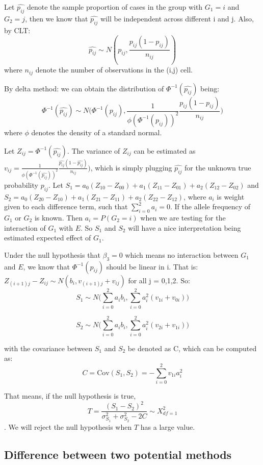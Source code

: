 \documentclass[]{article}
\begin{document}
Let \(\hat{p_{ij}}\) denote the sample proportion of cases in the group
with \(G_1 = i\) and \(G_2 = j\), then we know that \(\hat{p_{ij}}\)
will be independent across different i and j. Also, by CLT:
\[\hat{p_{ij}} \sim N(p_{ij},\frac{p_{ij}(1-p_{ij})}{n_{ij}})\] where
\(n_{ij}\) denote the number of observations in the (i,j) cell.

By delta method: we can obtain the distribution of
\(\Phi^{-1}(\hat{p_{ij}})\) being:
\[\Phi^{-1}(\hat{p_{ij}}) \sim N\bigg(\Phi^{-1}(p_{ij}),\frac{1}{\phi(\Phi^{-1}(p_{ij}))^2}\frac{p_{ij}(1-p_{ij})}{n_{ij}}\bigg)\]
where \(\phi\) denotes the density of a standard normal.

Let \(Z_{ij} = \Phi^{-1}(\hat{p_{ij}})\). The variance of \(Z_{ij}\) can
be estimated as
\(v_{ij} = \frac{1}{\phi(\Phi^{-1}(\hat{p_{ij}}))^2}\frac{\hat{p_{ij}}(1-\hat{p_{ij}})}{n_{ij}}\bigg)\),
which is simply plugging \(\hat{p_{ij}}\) for the unknown true
probability \(p_{ij}\). Let
\(S_1 = a_0(Z_{10}-Z_{00}) + a_1(Z_{11}-Z_{01}) + a_2(Z_{12}-Z_{02})\)
and
\(S_2 = a_0(Z_{20}-Z_{10}) + a_1(Z_{21}-Z_{11}) + a_2(Z_{22}-Z_{12})\),
where \(a_i\) is weight given to each difference term, such that
\(\sum_{i=0}^2 a_i =0\). If the allele frequency of \(G_1\) or \(G_2\)
is known. Then \(a_i = P(G_2 =i)\) when we are testing for the
interaction of \(G_1\) with \(E\). So \(S_1\) and \(S_2\) will have a
nice interpretation being estimated expected effect of \(G_1\).

Under the null hypothesis that \(\beta_3 =0\) which means no interaction
between \(G_1\) and \(E\), we know that \(\Phi^{-1}(p_{ij})\) should be
linear in i. That is:
\(Z_{(i+1)j} - Z_{ij} \sim N(b_i,v_{(i+1)j} + v_{ij})\) for all j =
0,1,2. So:
\[S_1 \sim N\bigg(\sum_{i=0}^{2}a_ib_i,\sum_{i=0}^{2}a_i^2(v_{1i}+v_{0i})\bigg) \]

\[S_2 \sim N\bigg(\sum_{i=0}^{2}a_ib_i,\sum_{i=0}^{2}a_i^2(v_{2i}+v_{1i})\bigg) \]

with the covariance between \(S_1\) and \(S_2\) be denoted as C, which
can be computed as:
\[ C = \text{Cov}(S_1,S_2) = -\sum_{i=0}^{2}v_{1i}a_i^2 \]

That means, if the null hypothesis is true,
\[ T = \frac{(S_1-S_2)^2}{\sigma_{S_1}^2+\sigma_{S_2}^2 -2C} \sim X^2_{df=1}\].
We will reject the null hypothesis when \(T\) has a large value.

\hypertarget{difference-between-two-potential-methods}{%
\subsection{Difference between two potential
methods}\label{difference-between-two-potential-methods}}
\end{document}
